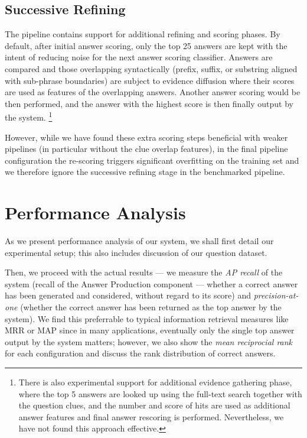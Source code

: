 \subsection{Successive Refining}

The pipeline contains support for additional refining and scoring phases.
By default, after initial answer scoring,
only the top 25 answers are kept with the intent of reducing noise for the next answer scoring classifier.
Answers are compared and those overlapping syntactically (prefix, suffix, or substring aligned with sub-phrase boundaries)
are subject to evidence diffusion where their scores are used as features of the overlapping answers.
Another answer scoring would be then performed, and the answer with the highest score is then finally output by the system.%
\footnote{There is also experimental support for additional evidence gathering phase, where the top 5 answers are looked up using the full-text search together with the question clues, and the number and score of hits are used as additional answer features and final answer rescoring is performed.  Nevertheless, we have not found this approach effective.}

However, while we have found these extra scoring steps beneficial with
weaker pipelines (in particular without the clue overlap features),
in the final pipeline configuration the re-scoring triggers significant
overfitting on the training set and we therefore ignore
the successive refining stage in the benchmarked pipeline.


\section{Performance Analysis}
\label{sec:results}

As we present performance analysis of our system,
we shall first detail our experimental setup;
this also includes discussion of our question dataset.

Then, we proceed with the actual results --- we measure the \textit{AP recall}
of the system (recall of the Answer Production component --- whether a correct answer has been generated and considered,
without regard to its score) and \textit{precision-at-one} (whether the
correct answer has been returned as the top answer by the system).
We find this preferrable to typical information retrieval measures like MRR or MAP
since in many applications, eventually only the single top answer output by the system
matters; however, we also show the \textit{mean reciprocial rank}
for each configuration and discuss the rank distribution of correct answers.


